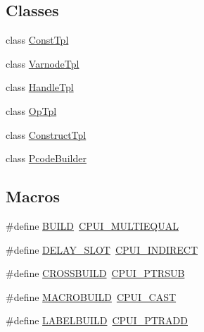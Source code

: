 \subsection*{Classes}
\begin{DoxyCompactItemize}
\item 
class \mbox{\hyperlink{class_const_tpl}{Const\+Tpl}}
\item 
class \mbox{\hyperlink{class_varnode_tpl}{Varnode\+Tpl}}
\item 
class \mbox{\hyperlink{class_handle_tpl}{Handle\+Tpl}}
\item 
class \mbox{\hyperlink{class_op_tpl}{Op\+Tpl}}
\item 
class \mbox{\hyperlink{class_construct_tpl}{Construct\+Tpl}}
\item 
class \mbox{\hyperlink{class_pcode_builder}{Pcode\+Builder}}
\end{DoxyCompactItemize}
\subsection*{Macros}
\begin{DoxyCompactItemize}
\item 
\#define \mbox{\hyperlink{semantics_8hh_a03505fe2d99ef550d9e1d39f57048908}{B\+U\+I\+LD}}~\mbox{\hyperlink{opcodes_8hh_abeb7dfb0e9e2b3114e240a405d046ea7a108d223da48e77fa181637fc3e75d9e8}{C\+P\+U\+I\+\_\+\+M\+U\+L\+T\+I\+E\+Q\+U\+AL}}
\item 
\#define \mbox{\hyperlink{semantics_8hh_abaef87dd5a374a8e2f3b01f0ae6ed3e4}{D\+E\+L\+A\+Y\+\_\+\+S\+L\+OT}}~\mbox{\hyperlink{opcodes_8hh_abeb7dfb0e9e2b3114e240a405d046ea7aa89e33b07a26ca7d26b54315e45c8424}{C\+P\+U\+I\+\_\+\+I\+N\+D\+I\+R\+E\+CT}}
\item 
\#define \mbox{\hyperlink{semantics_8hh_a2b03cfa43a7f7132ca5adeb2ea9199ec}{C\+R\+O\+S\+S\+B\+U\+I\+LD}}~\mbox{\hyperlink{opcodes_8hh_abeb7dfb0e9e2b3114e240a405d046ea7acd169003bfcb2e8dde0cb2dc1f534449}{C\+P\+U\+I\+\_\+\+P\+T\+R\+S\+UB}}
\item 
\#define \mbox{\hyperlink{semantics_8hh_ab3a7173db305a7f55caddd2f765f3475}{M\+A\+C\+R\+O\+B\+U\+I\+LD}}~\mbox{\hyperlink{opcodes_8hh_abeb7dfb0e9e2b3114e240a405d046ea7ab83bb63150022cfa8faab94c521b0a38}{C\+P\+U\+I\+\_\+\+C\+A\+ST}}
\item 
\#define \mbox{\hyperlink{semantics_8hh_ae2d88184cb8fe4e367ba16c958e4a0d1}{L\+A\+B\+E\+L\+B\+U\+I\+LD}}~\mbox{\hyperlink{opcodes_8hh_abeb7dfb0e9e2b3114e240a405d046ea7a148cdebda954b28dbd249f8ad3f32142}{C\+P\+U\+I\+\_\+\+P\+T\+R\+A\+DD}}
\end{DoxyCompactItemize}


